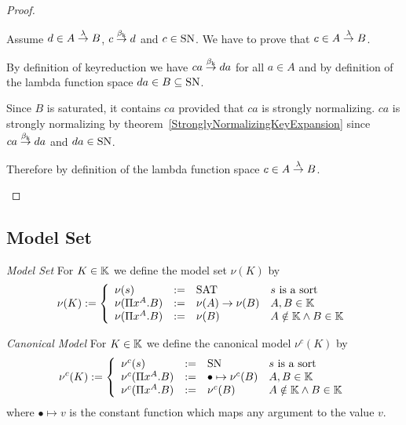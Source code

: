 \begin{theorem}
\begin{proof}
\begin{enumerate}
            Assume $d \in A \stackrel{\lambda}{\to} B$, $c \stackrel{\beta_{\text{k}}}{\to} d$ and $c \in \text{SN}$. We
            have to prove that $c \in A \stackrel{\lambda}{\to} B$.

            By definition of keyreduction we have $ca \stackrel{\beta_{\text{k}}}{\to} da$ for all $a
            \in A$ and by definition of the lambda function space $da \in
            B \subseteq \text{SN}$.

            Since $B$ is saturated, it contains $ca$ provided that $ca$ is
            strongly normalizing. $ca$ is strongly normalizing by
            theorem~\ref{StronglyNormalizingKeyExpansion} since $ca \stackrel{\beta_{\text{k}}}{\to}
            da$ and $da \in \text{SN}$.

            Therefore by definition of
            the lambda function space $c \in A \stackrel{\lambda}{\to} B$.
        \end{enumerate}
    \end{proof}
\end{theorem}




\subsection{Model Set}

\begin{definition}
    \emph{Model Set} For $K \in \mathbb{K}$ we define the model set
    $\nu(K)$ by
    $$
        \nu(K) :=
        \left \{
        \begin{array}{llll}
            \nu(s) &:=& \text{SAT} & s \text{ is a sort}
            \\
            \nu(\Pi x^A. B) &:=& \nu(A)\to \nu(B) & A,B \in \mathbb{K}
            \\
            \nu(\Pi x^A. B) &:=& \nu(B) & A \notin \mathbb{K} \land B \in \mathbb{K}
        \end{array}
        \right.
    $$
\end{definition}



\begin{definition}
    \emph{Canonical Model} For $K \in \mathbb{K}$ we define the
    canonical model $\nu^c(K)$ by
    $$
        \nu^c(K) :=
        \left \{
        \begin{array}{llll}
            \nu^c(s) &:=& \text{SN} & s \text{ is a sort}
            \\
            \nu^c(\Pi x^A. B)
            &:=&
            \bullet \mapsto \nu^c(B) & A,B \in \mathbb{K}
            \\
            \nu^c(\Pi x^A. B)
            &:=&
            \nu^c(B) & A \notin \mathbb{K} \land B \in \mathbb{K}
        \end{array}
        \right.
    $$
    where $\bullet \mapsto v$ is the constant function which maps any argument
    to the value $v$.
\end{definition}



